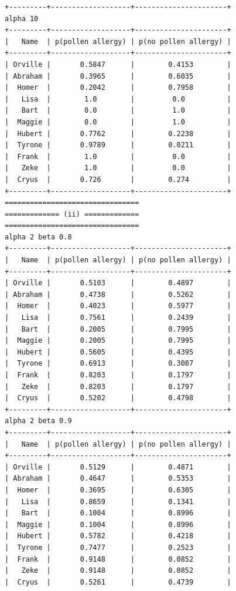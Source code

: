 \documentclass{article}
\begin{document}
\begin{lstlisting}
+---------+-------------------+----------------------+
alpha 10
+---------+-------------------+----------------------+
|   Name  | p(pollen allergy) | p(no pollen allergy) |
+---------+-------------------+----------------------+
| Orville |       0.5847      |        0.4153        |
| Abraham |       0.3965      |        0.6035        |
|  Homer  |       0.2042      |        0.7958        |
|   Lisa  |        1.0        |         0.0          |
|   Bart  |        0.0        |         1.0          |
|  Maggie |        0.0        |         1.0          |
|  Hubert |       0.7762      |        0.2238        |
|  Tyrone |       0.9789      |        0.0211        |
|  Frank  |        1.0        |         0.0          |
|   Zeke  |        1.0        |         0.0          |
|  Cryus  |       0.726       |        0.274         |
+---------+-------------------+----------------------+
================================
============= (ii) =============
================================
alpha 2 beta 0.8
+---------+-------------------+----------------------+
|   Name  | p(pollen allergy) | p(no pollen allergy) |
+---------+-------------------+----------------------+
| Orville |       0.5103      |        0.4897        |
| Abraham |       0.4738      |        0.5262        |
|  Homer  |       0.4023      |        0.5977        |
|   Lisa  |       0.7561      |        0.2439        |
|   Bart  |       0.2005      |        0.7995        |
|  Maggie |       0.2005      |        0.7995        |
|  Hubert |       0.5605      |        0.4395        |
|  Tyrone |       0.6913      |        0.3087        |
|  Frank  |       0.8203      |        0.1797        |
|   Zeke  |       0.8203      |        0.1797        |
|  Cryus  |       0.5202      |        0.4798        |
+---------+-------------------+----------------------+
alpha 2 beta 0.9
+---------+-------------------+----------------------+
|   Name  | p(pollen allergy) | p(no pollen allergy) |
+---------+-------------------+----------------------+
| Orville |       0.5129      |        0.4871        |
| Abraham |       0.4647      |        0.5353        |
|  Homer  |       0.3695      |        0.6305        |
|   Lisa  |       0.8659      |        0.1341        |
|   Bart  |       0.1004      |        0.8996        |
|  Maggie |       0.1004      |        0.8996        |
|  Hubert |       0.5782      |        0.4218        |
|  Tyrone |       0.7477      |        0.2523        |
|  Frank  |       0.9148      |        0.0852        |
|   Zeke  |       0.9148      |        0.0852        |
|  Cryus  |       0.5261      |        0.4739        |

\end{lstlisting}
\end{document}
